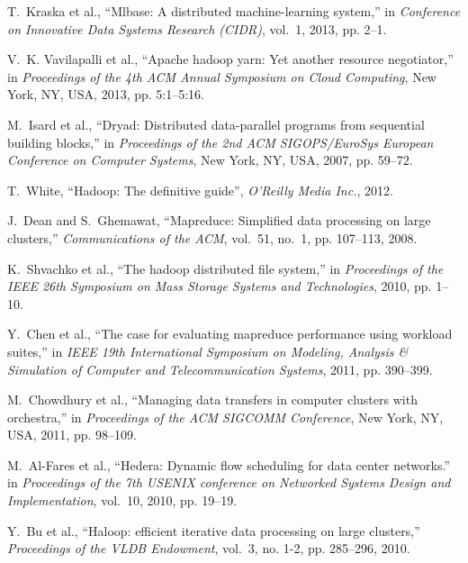 \documentclass[10pt,journal,compsoc]{IEEEtran}
\begin{document}
\begin{thebibliography}{44}
T.~Kraska et al., ``Mlbase: A distributed machine-learning system,'' in
  \emph{Conference on Innovative Data Systems Research (CIDR)}, vol.~1, 2013,
  pp. 2--1.

V.~K. Vavilapalli et al., ``Apache hadoop yarn: Yet another
  resource negotiator,'' in \emph{Proceedings of the 4th ACM Annual Symposium
  on Cloud Computing}, New York, NY, USA, 2013, pp. 5:1--5:16.


M.~Isard et al., ``Dryad: Distributed
  data-parallel programs from sequential building blocks,'' in
  \emph{Proceedings of the 2nd ACM SIGOPS/EuroSys European Conference on
  Computer Systems}, New York, NY, USA, 2007, pp. 59--72.

T.~White, ``Hadoop: The definitive guide'', \emph{O'Reilly Media Inc.}, 2012.

J.~Dean and S.~Ghemawat, ``Mapreduce: Simplified data processing on large
  clusters,'' \emph{Communications of the ACM}, vol.~51, no.~1, pp. 107--113,
  2008.

K.~Shvachko et al., ``The hadoop distributed file
  system,'' in \emph{Proceedings of the IEEE 26th Symposium on Mass Storage
  Systems and Technologies}, 2010,
  pp. 1--10.

Y.~Chen et al., ``The case for evaluating
  mapreduce performance using workload suites,'' in \emph{IEEE 19th
  International Symposium on Modeling, Analysis \& Simulation of Computer and
  Telecommunication Systems}, 2011, pp. 390--399.

M.~Chowdhury et al., ``Managing data
  transfers in computer clusters with orchestra,'' in \emph{Proceedings of the
  ACM SIGCOMM Conference}, New York, NY,
  USA, 2011, pp. 98--109.

M.~Al-Fares et al., ``Hedera:
  Dynamic flow scheduling for data center networks.'' in \emph{Proceedings of
  the 7th USENIX conference on Networked Systems Design and Implementation},
  vol.~10, 2010, pp. 19--19.

Y.~Bu et al., ``Haloop: efficient iterative
  data processing on large clusters,'' \emph{Proceedings of the VLDB
  Endowment}, vol.~3, no. 1-2, pp. 285--296, 2010.


\end{thebibliography}
\end{document}
